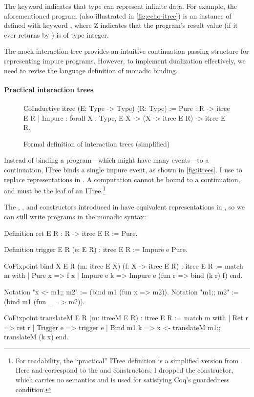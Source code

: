 The  keyword indicates that type  can represent
infinite data.  For example, the aforementioned  program (also
illustrated in \autoref{fig:echo-itree}) is an instance of  defined with keyword , where \ilc Z indicates that the
program's result value (if it ever returns by ) is of type integer.

The mock interaction tree provides an intuitive continuation-passing structure
for representing impure programs.  However, to implement dualization
effectively, we need to revise the language definition of monadic binding.

\paragraph{Practical interaction trees}

\begin{figure}
\begin{coq}
  CoInductive itree (E: Type -> Type) (R: Type) :=
    Pure   : R -> itree E R
  | Impure : forall {X : Type}, E X -> (X -> itree E R) -> itree E R.
\end{coq}
\caption{Formal definition of interaction trees (simplified)}
\label{fig:itrees}
\end{figure}

Instead of binding a program---which might have many events---to a continuation,
ITree binds a single impure event, as shown in \autoref{fig:itrees}.  I
use  to replace  representations
in .  A  computation cannot be bound to a continuation,
and must be the leaf of an ITree.\footnote{For readability, the ``practical''
ITree definition is a simplified version from \citet{itree}.  Here 
and  correspond to the  and  constructors.  I
dropped the  constructor, which carries no
semantics and is used for satisfying Coq's guardedness condition.}

The , , and  constructors introduced in
 have equivalent representations in , so we can still
write programs in the monadic syntax:
\begin{coq}
  Definition ret {E R} : R -> itree E R := Pure.
  
  Definition trigger {E R} (e: E R) : itree E R := Impure e Pure.

  CoFixpoint bind {X E R} (m: itree E X) (f: X -> itree E R) : itree E R :=
    match m with
    | Pure   x   => f x
    | Impure e k => Impure e (fun r => bind (k r) f)
    end.

  Notation "x <- m1;; m2" := (bind m1 (fun x => m2)).
  Notation "m1;; m2"      := (bind m1 (fun _ => m2)).

  CoFixpoint translateM {E R} (m: itreeM E R) : itree E R :=
    match m with
    | Ret     r => ret r
    | Trigger e => trigger e
    | Bind m1 k => x <- translateM m1;; translateM (k x)
    end.
\end{coq}

